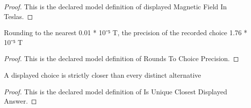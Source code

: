 \begin{proof}
  This is the declared model definition of displayed Magnetic Field In Teslas.
\end{proof}
\begin{definition}
  \label{def:physics:phyx-mini-0961:phyxminiproblems-problemphyxmini0961-roundstochoiceprecision}
  Rounding to the nearest 0.01 * 10⁻⁵ T, the precision of the recorded choice 1.76 * 10⁻⁵ T
\end{definition}
\begin{proof}
  This is the declared model definition of Rounds To Choice Precision.
\end{proof}
\begin{definition}
  \label{def:physics:phyx-mini-0961:phyxminiproblems-problemphyxmini0961-isuniqueclosestdisplayedanswer}
  A displayed choice is strictly closer than every distinct alternative
\end{definition}
\begin{proof}
  This is the declared model definition of Is Unique Closest Displayed Answer.
\end{proof}
